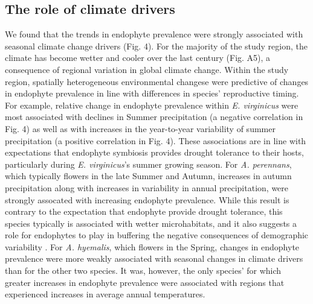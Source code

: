 \documentclass[11pt]{article}
\begin{document}
\subsection*{The role of climate drivers}
We found that the trends in endophyte prevalence were strongly associated with seasonal climate change drivers (Fig. 4). 
For the majority of the study region, the climate has become wetter and cooler over the last century (Fig. A5), a consequence of regional variation in global climate change. 
Within the study region, spatially heterogeneous environmental changese were predictive of changes in endophyte prevalence in line with differences in species' reproductive timing. 
For example, relative change in endophyte prevalence within \emph{E. virginicus} were most associated with declines in Summer precipitation  (a negative correlation in Fig. 4) as well as with increases in the year-to-year variability of summer precipitation (a positive correlation in Fig. 4).
These associations are in line with expectations that endophyte symbiosis provides drought tolerance to their hosts, particularly during \emph{E. virginicus}'s summer growing season. 
For \emph{A. perennans}, which typically flowers in the late Summer and Autumn, increases in autumn precipitation along with increases in variability in annual precipitation, were strongly assocated with increasing endophyte prevalence.  
While this result is contrary to the expectation that endophyte provide drought tolerance, this species typically is associated with wetter microhabitats, and it also suggests a role for endophytes to play in buffering the negative consequences of demographic variability \citep{lewontin_population_1969}.  
For \emph{A. hyemalis}, which flowers in the Spring, changes in endophyte prevalence were more weakly associated with seasonal changes in climate drivers than for the other two species.
It was, however, the only species' for which greater increases in endophyte prevalence were associated with regions that experienced increases in average annual temperatures.
\end{document}
